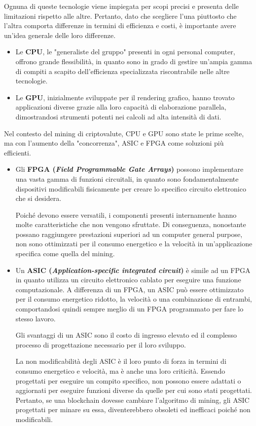 Ognuna di queste tecnologie viene impiegata per scopi precisi e presenta delle limitazioni rispetto alle altre.
Pertanto, dato che scegliere l'una piuttosto che l'altra comporta differenze in termini di efficienza e costi, è importante avere un'idea generale delle loro differenze.

\begin{itemize}
    \item Le \textbf{CPU}, le "generaliste del gruppo" presenti in ogni personal computer, offrono grande flessibilità, in quanto sono in grado di gestire un'ampia gamma di compiti a scapito dell'efficienza specializzata riscontrabile nelle altre tecnologie.
    \item Le \textbf{GPU}, inizialmente sviluppate per il rendering grafico, hanno trovato applicazioni diverse grazie alla loro capacità di elaborazione parallela, dimostrandosi strumenti potenti nei calcoli ad alta intensità di dati.
\end{itemize}

Nel contesto del mining di criptovalute, CPU e GPU sono state le prime scelte, ma con l'aumento della "concorrenza", ASIC e FPGA come soluzioni più efficienti.

\begin{itemize}
    \item Gli \textbf{FPGA (\textit{Field Programmable Gate Arrays})} possono implementare una vasta gamma di funzioni circuitali, in quanto sono fondamentalmente dispositivi modificabili fisicamente per creare lo specifico circuito elettronico che si desidera. 

    Poiché devono essere versatili, i componenti presenti internamente hanno molte caratteristiche che non vengono sfruttate. 
    Di conseguenza, nonostante possano raggiungere prestazioni superiori ad un computer general purpose, non sono ottimizzati per il consumo energetico e la velocità in un'applicazione specifica come quella del mining. 

    \item Un \textbf{ASIC (\textit{Application-specific integrated circuit})} è simile ad un FPGA in quanto utilizza un circuito elettronico cablato per eseguire una funzione computazionale. 
    A differenza di un FPGA, un ASIC può essere ottimizzato per il consumo energetico ridotto, la velocità o una combinazione di entrambi, comportandosi quindi sempre meglio di un FPGA programmato per fare lo stesso lavoro. 
    
    Gli svantaggi di un ASIC sono il costo di ingresso elevato ed il complesso processo di progettazione necessario per il loro sviluppo.

    La non modificabilità degli ASIC è il loro punto di forza in termini di consumo energetico e velocità, ma è anche una loro criticità. 
    Essendo progettati per eseguire un compito specifico, non possono essere adattati o aggiornati per eseguire funzioni diverse da quelle per cui sono stati progettati. 
    Pertanto, se una blockchain dovesse cambiare l'algoritmo di mining, gli ASIC progettati per minare su essa, diventerebbero obsoleti ed inefficaci poiché non modificabili.
\end{itemize}

